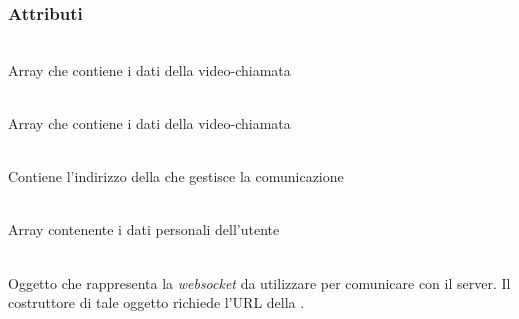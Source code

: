 \subsubsection*{Attributi}
\begin{description}
\item{}\\
Array che contiene i dati della video-chiamata
\item{}\\
Array che contiene i dati della video-chiamata
\item{}\\
Contiene l'indirizzo della  che gestisce la comunicazione
\item{}\\
Array contenente i dati personali dell'utente
\item{}\\
Oggetto che rappresenta la \textit{websocket} da utilizzare per comunicare con il server. Il costruttore di tale oggetto richiede l'URL della .

\end{description}

